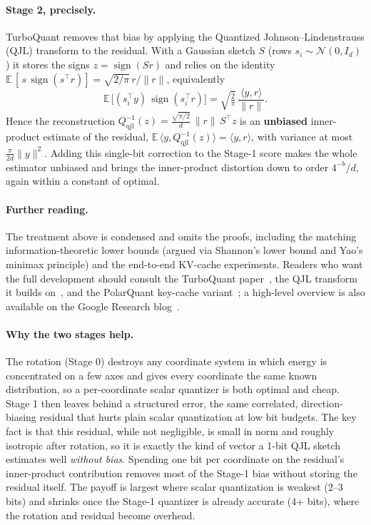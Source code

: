 \documentclass[11pt]{article}
\begin{document}
\paragraph{Stage 2, precisely.} TurboQuant removes that bias by applying the Quantized Johnson--Lindenstrauss (QJL) transform to the residual. With a Gaussian sketch $S$ (rows $s_i \sim \mathcal{N}(0, I_d)$) it stores the signs $z = \operatorname{sign}(Sr)$ and relies on the identity $\mathbb{E}\,[\,s\,\operatorname{sign}(s^\top r)] = \sqrt{2/\pi}\,r/\|r\|$, equivalently
\begin{equation}
\mathbb{E}\,\bigl[(s_i^\top y)\,\operatorname{sign}(s_i^\top r)\bigr] = \sqrt{\tfrac{2}{\pi}}\,\frac{\langle y, r\rangle}{\|r\|}.
\end{equation}
Hence the reconstruction $Q_{\mathrm{qjl}}^{-1}(z) = \frac{\sqrt{\pi/2}}{d}\,\|r\|\,S^\top z$ is an \textbf{unbiased} inner-product estimate of the residual, $\mathbb{E}\,\langle y, Q_{\mathrm{qjl}}^{-1}(z)\rangle = \langle y, r\rangle$, with variance at most $\tfrac{\pi}{2d}\|y\|^2$. Adding this single-bit correction to the Stage-1 score makes the whole estimator unbiased and brings the inner-product distortion down to order $4^{-b}/d$, again within a constant of optimal.

\paragraph{Further reading.} The treatment above is condensed and omits the proofs, including the matching information-theoretic lower bounds (argued via Shannon's lower bound and Yao's minimax principle) and the end-to-end KV-cache experiments. Readers who want the full development should consult the TurboQuant paper~\cite{turboquant2026}, the QJL transform it builds on~\cite{qjl2025}, and the PolarQuant key-cache variant~\cite{polarquant2026}; a high-level overview is also available on the Google Research blog~\cite{turboquantblog}.

\paragraph{Why the two stages help.} The rotation (Stage 0) destroys any coordinate system in which energy is concentrated on a few axes and gives every coordinate the same known distribution, so a per-coordinate scalar quantizer is both optimal and cheap. Stage 1 then leaves behind a structured error, the same correlated, direction-biasing residual that hurts plain scalar quantization at low bit budgets. The key fact is that this residual, while not negligible, is small in norm and roughly isotropic after rotation, so it is exactly the kind of vector a 1-bit QJL sketch estimates well \emph{without bias}. Spending one bit per coordinate on the residual's inner-product contribution removes most of the Stage-1 bias without storing the residual itself. The payoff is largest where scalar quantization is weakest (2--3 bits) and shrinks once the Stage-1 quantizer is already accurate (4+ bits), where the rotation and residual become overhead.
\end{document}
